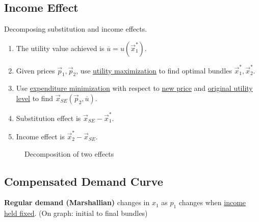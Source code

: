 \documentclass[]{article}
\begin{document}
        \subsection{Income Effect}
            \begin{remark} Decomposing substitution and income effects.
                \begin{enumerate}
                    \item The utility value achieved is $\overline{u} = u(\vec{x}^*_1)$.
                    \item Given prices $\vec{p}_1, \vec{p}_2$, use \ul{utility maximization} to find optimal bundles $\vec{x}^*_1, \vec{x}^*_2$.
                    \item Use \ul{expenditure minimization} with respect to \ul{new price} and \ul{original utility level} to find $\vec{x}_{SE}(\vec{p}_2, \overline{u})$.
                    \item Substitution effect is $\vec{x}_{SE} - \vec{x}^*_1$.
                    \item Income effect is $\vec{x}^*_2 - \vec{x}_{SE}$.
                \end{enumerate}
            \end{remark}
            \begin{figure}[h]
                \centering
                \caption{Decomposition of two effects}
            \end{figure}
        
        \subsection{Compensated Demand Curve}
            \begin{remark}
                \textbf{Regular demand (Marshallian)} changes in $x_1$ as $p_1$ changes when \ul{income held fixed}. (On graph: initial to final bundles)
            \end{remark}
            
\end{document}
